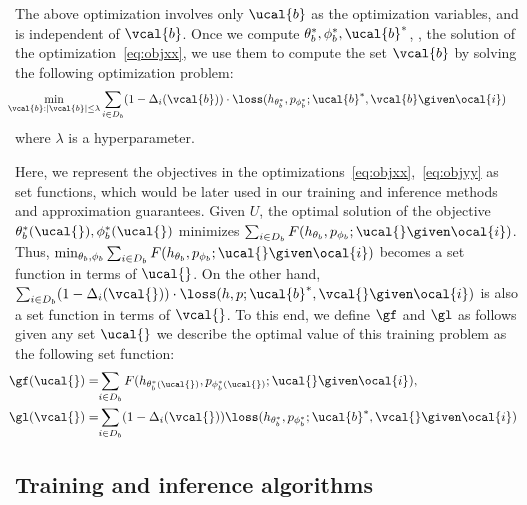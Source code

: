 \documentclass[letterpaper]{article}
\begin{document}
 The above optimization involves only $\ucal{b}$ as the optimization variables, and is independent of $\vcal{b}$. Once we compute $\theta_b ^*, \phi_b ^*, \ucal{b} ^*$, \ie, the solution of the optimization~\eqref{eq:objxx}, we use them to compute the set $\vcal{b}$ by solving the following optimization problem:
\begin{align}
&\hspace{-3mm} \min_{\vcal{b}: |\vcal{b}|\le\lambda } \sum_{i\in D_b} (1-\Delta_i(\vcal{b}) )\cdot \loss(h_{\theta_b ^*},p_{\phi_b ^*}; \ucal{b}^*, \vcal{b}\given \ocal{i} ) \label{eq:objyy}
 \end{align}
where $\lambda$ is a hyperparameter.

 Here, we represent the objectives in the optimizations~\eqref{eq:objxx},~\eqref{eq:objyy} as set functions, which would be later used in our training and inference methods and approximation guarantees. Given $U$,  the optimal solution of the objective $\theta_b ^*(\ucal{}), \phi_b ^*(\ucal{})$  minimizes 
  $\sum_{i\in D_b}F(h_{\theta_b},p_{\phi_b};\ucal{} \given \ocal{i})$. Thus,  $\min_{\theta_b, \phi_b}\sum_{i\in D_b}F(h_{\theta_b},p_{\phi_b};\ucal{} \given \ocal{i})$ becomes a set function in terms of $\ucal{}$. On the other hand,  $  \sum_{i\in D_b} (1-\Delta_i(\vcal{}) )\cdot \loss(h,p; \ucal{b}^*, \vcal{}\given \ocal{i} )$ is also a set function in terms of  $\vcal{}$.
 To this end, we define $\gf$ and $\gl$ as follows 
 given any set $\ucal{}$ we  
 describe the optimal value of this training problem as the following set function:
 \begin{align}
&   \hspace{-2mm}  \gf(\ucal{})  = \hspace{-1mm}\sum_{i\in D_b}F(h_{\theta_b ^*(\ucal{})},p_{\phi_b ^*(\ucal{})};\ucal{} \given \ocal{i}),  \label{eq:Gdefx}
 \\
 &\hspace{-2mm} \gl(\vcal{})  = \hspace{-1mm}\sum_{i\in D_b} (1-\Delta_i(\vcal{}) )  \loss(h_{\theta_b ^* },p_{\phi_b ^* }; \ucal{b}^*, \vcal{}\given \ocal{i} )
     \label{eq:Gdef}
 \end{align}



 \subsection{Training and inference algorithms}
\end{document}
